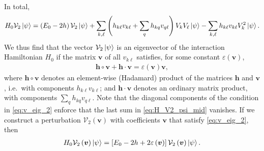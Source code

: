 \documentclass[nofootinbib,notitlepage,11pt]{revtex4-2}
\newcommand{\p}[1]{\left(#1\right)} %
\renewcommand{\sp}[1]{\left[#1\right]} %
\renewcommand{\v}{\bm} %
\renewcommand{\c}{\cdot} %
\newcommand{\1}{\mathds{1}}
\newcommand{\V}{\mathcal{V}}
\begin{document}
In total,
\begin{align}
  H_0 \V_2 \ket\psi
  = \p{E_0 - 2h} \V_2 \ket\psi
  + \sum_{k,\ell} \p{h_{k\ell} v_{k\ell} + \sum_q h_{kq} v_{q\ell}}
  V_k V_\ell \ket\psi
  - \sum_{k,\ell} h_{k\ell} v_{k\ell} V_k^2 \ket\psi.
  \label{eq:H_V2_psi_mid}
\end{align}
We thus find that the vector $\V_2\ket\psi$ is an eigenvector of the
interaction Hamiltonian $H_0$ if the matrix $\v v$ of all $v_{k\ell}$
satisfies, for some constant $\varepsilon\p{\v v}$,
\begin{align}
  \v h\circ \v v + \v h\c\v v
  = \varepsilon\p{\v v} \v v,
  \label{eq:v_eig_2}
\end{align}
where $\v h\circ\v v$ denotes an element-wise (Hadamard) product of
the matrices $\v h$ and $\v v$, i.e.~with components
$h_{k\ell} v_{k\ell}$; and $\v h\c\v v$ denotes an ordinary matrix
product, with components $\sum_q h_{kq} v_{q\ell}$.  Note that the
diagonal components of the condition in \eqref{eq:v_eig_2} enforce
that the last sum in \eqref{eq:H_V2_psi_mid} vanishes.  If we
construct a perturbation $\V_2\p{\v v}$ with coefficients $\v v$ that
satisfy \eqref{eq:v_eig_2}, then
\begin{align}
  H_0 \V_2\p{\v v} \ket\psi
  = \sp{E_0 - 2h + 2\varepsilon\p{\v v}} \V_2\p{\v v} \ket\psi.
\end{align}


\end{document}
